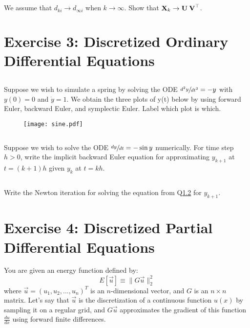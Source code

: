 \subsection{} We assume that $d_{ki} \to d_{\infty i}$ when $k \to \infty$. Show that ${\bf X}_k \to {\bf U \: V}^\top$.
\pagebreak


\section{Exercise 3: Discretized Ordinary Differential Equations} 

\subsection{} Suppose we wish to simulate a spring by solving the ODE $\sfrac{d^2y}{dt^2} = -y$ with $y(0)=0$ and $\dot{y}=1$. We obtain the three plots of y(t) below by using forward Euler, backward Euler, and symplectic Euler. Label which plot is which.
\begin{figure}[h!]
\centering
\texttt{[image: sine.pdf]}
\end{figure}
\vspace{2cm}

\subsection{}\label{sine} Suppose we wish to solve the ODE $\sfrac{dy}{dt}=-\sin y$ numerically. For time step $h > 0$, write the
implicit backward Euler equation for approximating $y_{k+1}$ at $t = (k + 1)h$ given $y_k$ at $t = kh$.
\vspace{7cm}

\subsection{} Write the Newton iteration for solving the equation from Q\ref{sine} for $y_{k+1}$.
\pagebreak


\section{Exercise 4: Discretized Partial Differential Equations} You are given an energy function defined by:
\begin{equation*}
E[\vec{u}]\equiv \|G \vec{u}\|_2^2
\end{equation*}
where $\vec{u}=(u_1,u_2,...,u_n)^T$ is an $n$-dimensional vector, and $G$ is an $n\times n$ matrix. Let's say that $\vec{u}$ is the discretization of a continuous function $u(x)$ by sampling it on a regular grid, and $G\vec{u}$ approximates the gradient of this function $\frac{du}{dx}$ using forward finite differences.

